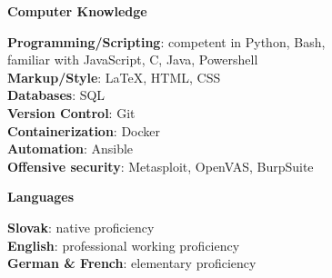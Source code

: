 \documentclass[12pt]{article}
\begin{document}
{{%

\vspace{0.2in} %

\begin{center}
	{\noindent \bfseries Computer Knowledge}
\end{center}

\vspace{0.1pt}

\noindent
{\bfseries Programming/Scripting}: competent in Python, Bash, \\[0.02in]
familiar with JavaScript, C, Java, Powershell \\[0.04in]
{\bfseries Markup/Style}: \LaTeX, HTML, CSS \\[0.04in]
{\bfseries Databases}: SQL \\[0.04in]
{\bfseries Version Control}: Git \\[0.04in]
{\bfseries Containerization}: Docker  \\[0.04in]
{\bfseries Automation}: Ansible \\[0.04in]
{\bfseries Offensive security}: Metasploit, OpenVAS, BurpSuite \\[0.04in]

\vspace{0.2in} %


\begin{center}
	{\noindent \bfseries Languages}
\end{center} 

\vspace{0.1pt}

\noindent
{\bfseries Slovak}: native proficiency \\[0.04in]
{\bfseries English}: professional working proficiency \\[0.04in]
{\bfseries German \& French}: elementary proficiency \\[0.04in]

}}
\end{document}
